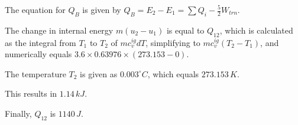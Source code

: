 The equation for \( Q_B \) is given by \( Q_B = E_2 - E_1 = \sum Q_i - \frac{5}{2} W_{trn} \).

The change in internal energy \( m (u_2 - u_1) \) is equal to \( Q_{12} \), which is calculated as the integral from \( T_1 \) to \( T_2 \) of \( m c_v^{ig} dT \), simplifying to \( m c_v^{ig} (T_2 - T_1) \), and numerically equals \( 3.6 \times 0.63976 \times (273.153 - 0) \).

The temperature \( T_2 \) is given as \( 0.003^\circ C \), which equals \( 273.153 \, K \).

This results in \( 1.14 \, kJ \).

Finally, \( Q_{12} \) is \( 1140 \, J \).